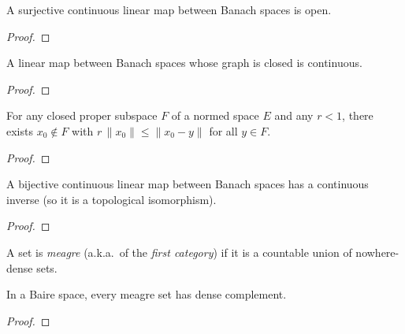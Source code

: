 \begin{theorem}
  \label{thm:open-mapping}
  \leanok
  A surjective continuous linear map between Banach spaces is open.
\end{theorem}
\begin{proof}
  \leanok
\end{proof}

\begin{theorem}
  \label{thm:closed-graph}
  \leanok
  A linear map between Banach spaces whose graph is closed is continuous.
\end{theorem}
\begin{proof}
  \leanok
\end{proof}

\begin{theorem}
  \label{thm:riesz-lemma}
  \leanok
  For any closed proper subspace $F$ of a normed space $E$ and any
  $r < 1$, there exists $x_0 \notin F$ with $r\,\|x_0\| \le \|x_0 - y\|$
  for all $y \in F$.
\end{theorem}
\begin{proof}
  \leanok
\end{proof}

\begin{theorem}
  \label{thm:bounded-inverse}
  \leanok
  A bijective continuous linear map between Banach spaces has a
  continuous inverse (so it is a topological isomorphism).
\end{theorem}
\begin{proof}
  \leanok
\end{proof}

\begin{definition}
  \label{def:meagre}
  \leanok
  A set is \emph{meagre} (a.k.a.\ of the \emph{first category}) if it
  is a countable union of nowhere-dense sets.
\end{definition}

\begin{theorem}
  \label{thm:meagre-compl-dense}
  \leanok
  In a Baire space, every meagre set has dense complement.
\end{theorem}
\begin{proof}
  \leanok
\end{proof}

